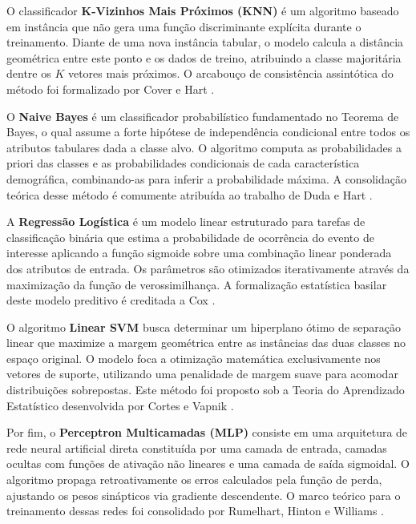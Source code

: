 O classificador \textbf{K-Vizinhos Mais Próximos (KNN)} é um algoritmo baseado em instância que não gera uma função discriminante explícita durante o treinamento. Diante de uma nova instância tabular, o modelo calcula a distância geométrica entre este ponto e os dados de treino, atribuindo a classe majoritária dentre os $K$ vetores mais próximos. O arcabouço de consistência assintótica do método foi formalizado por Cover e Hart \cite{coverhart1967nearest}.

O \textbf{Naive Bayes} é um classificador probabilístico fundamentado no Teorema de Bayes, o qual assume a forte hipótese de independência condicional entre todos os atributos tabulares dada a classe alvo. O algoritmo computa as probabilidades a priori das classes e as probabilidades condicionais de cada característica demográfica, combinando-as para inferir a probabilidade máxima. A consolidação teórica desse método é comumente atribuída ao trabalho de Duda e Hart \cite{dudahart1973pattern}.

A \textbf{Regressão Logística} é um modelo linear estruturado para tarefas de classificação binária que estima a probabilidade de ocorrência do evento de interesse aplicando a função sigmoide sobre uma combinação linear ponderada dos atributos de entrada. Os parâmetros são otimizados iterativamente através da maximização da função de verossimilhança. A formalização estatística basilar deste modelo preditivo é creditada a Cox \cite{cox1958regression}.

O algoritmo \textbf{Linear SVM} busca determinar um hiperplano ótimo de separação linear que maximize a margem geométrica entre as instâncias das duas classes no espaço original. O modelo foca a otimização matemática exclusivamente nos vetores de suporte, utilizando uma penalidade de margem suave para acomodar distribuições sobrepostas. Este método foi proposto sob a Teoria do Aprendizado Estatístico desenvolvida por Cortes e Vapnik \cite{cortesvapnik1995support}.

Por fim, o \textbf{Perceptron Multicamadas (MLP)} consiste em uma arquitetura de rede neural artificial direta constituída por uma camada de entrada, camadas ocultas com funções de ativação não lineares e uma camada de saída sigmoidal. O algoritmo propaga retroativamente os erros calculados pela função de perda, ajustando os pesos sinápticos via gradiente descendente. O marco teórico para o treinamento dessas redes foi consolidado por Rumelhart, Hinton e Williams \cite{rumelhart1986learning}.